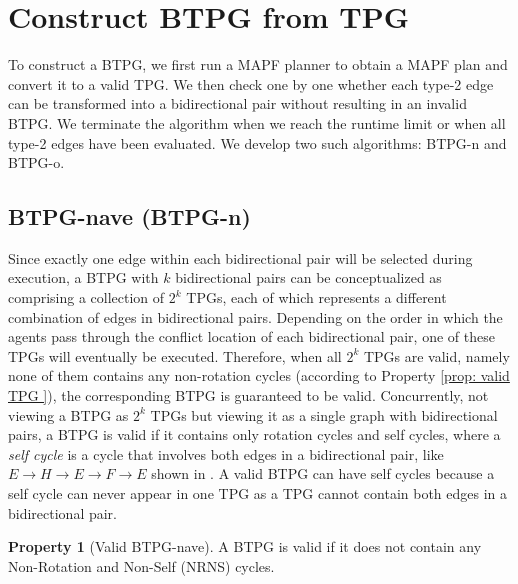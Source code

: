\documentclass[letterpaper]{article} %
\theoremstyle{definition}
\newtheorem{property}{Property}
\begin{document}
\section{Construct BTPG from TPG}
To construct a BTPG, we first run a MAPF planner to obtain a MAPF plan and convert it to a valid TPG. We then check one by one whether each type-2 edge can be transformed into a bidirectional pair without resulting in an invalid BTPG. We terminate the algorithm when we reach the runtime limit or when all type-2 edges have been evaluated. We develop two such algorithms: BTPG-n and BTPG-o.  

\subsection{BTPG-nave (BTPG-n)}
Since exactly one edge within each bidirectional pair will be selected during execution, a BTPG with $k$ bidirectional pairs can be conceptualized as comprising a collection of $2^k$ TPGs, each of which represents a different combination of edges in bidirectional pairs. Depending on the order in which the agents pass through the conflict location of each bidirectional pair, one of these TPGs will eventually be executed. Therefore, when all $2^k$ TPGs are valid, namely none of them contains any non-rotation cycles (according to Property \ref{prop: valid TPG }), the corresponding BTPG is guaranteed to be valid. Concurrently, not viewing a BTPG as $2^k$ TPGs but viewing it as a single graph with bidirectional pairs, a BTPG is valid if it contains only rotation cycles and self cycles, where a \emph{self cycle} is a cycle that involves both edges in a bidirectional pair, like $E\rightarrow H \rightarrow E \rightarrow F \rightarrow E$ shown in . A valid BTPG can have self cycles because a self cycle can never appear in one TPG as a TPG cannot contain both edges in a bidirectional pair. 

\begin{property}[Valid BTPG-nave]
\label{prop: valid BTPG - naive}
    A BTPG is valid if it does not contain any Non-Rotation and Non-Self (NRNS) cycles.
\end{property}
\end{document}
